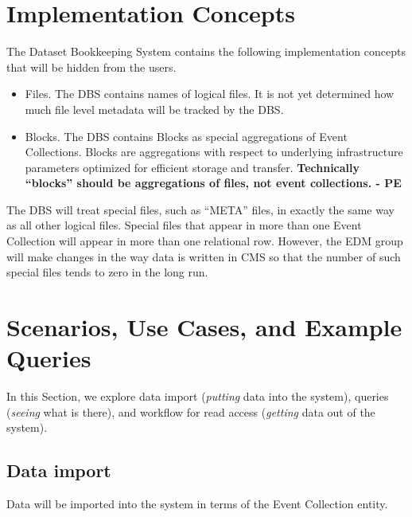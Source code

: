 \documentclass{cmspaper}
\begin{document}
\section{Implementation Concepts}

The Dataset Bookkeeping System contains the following implementation concepts 
that will be hidden from the users.  

\begin{itemize}
\item Files.  The DBS contains names of logical files.  It is not yet
determined how much file level metadata will be tracked by the DBS. 
\item Blocks.  The DBS contains Blocks as special aggregations of Event 
Collections. Blocks are aggregations with respect to underlying 
infrastructure parameters optimized for efficient storage and transfer.  
{\bf Technically ``blocks'' should be aggregations of files, not event
collections. - PE}
\end{itemize}

The DBS will treat special files, such as ``META'' files, in 
exactly the same way as all other logical files.  Special files that 
appear in more than one Event Collection will appear in more than one
relational row.  However, the EDM group will 
make changes in the way data is written in CMS so that the number of 
such special files tends to zero in the long run.  


\section{Scenarios, Use Cases, and Example Queries}

In this Section, we explore data import
({\em putting} data into the system), queries ({\em seeing} what is there),
and workflow for read access ({\em getting} data out of the system).

\subsection{Data import}

Data will be imported into the system in terms of the 
Event Collection entity.  

\end{document}
